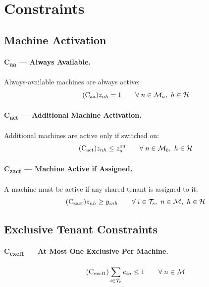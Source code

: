 \documentclass[11pt,a4paper]{article}
\newcommand{\Te}{\mathcal{T}_e}
\newcommand{\Ts}{\mathcal{T}_s}
\newcommand{\M}{\mathcal{M}}
\newcommand{\Ma}{\mathcal{M}_a}
\newcommand{\Mb}{\mathcal{M}_b}
\newcommand{\PH}{\mathcal{H}}
\begin{document}
\section{Constraints}

\subsection{Machine Activation}

\paragraph{C\textsubscript{aa} --- Always Available.}
Always-available machines are always active:
\begin{equation}\tag{C$_{\mathrm{aa}}$}
  z_{nh} = 1 \qquad \forall\; n \in \Ma,\ h \in \PH
\end{equation}

\paragraph{C\textsubscript{act} --- Additional Machine Activation.}
Additional machines are active only if switched on:
\begin{equation}\tag{C$_{\mathrm{act}}$}
  z_{nh} \leq z^{\mathrm{on}}_n \qquad \forall\; n \in \Mb,\ h \in \PH
\end{equation}

\paragraph{C\textsubscript{zact} --- Machine Active if Assigned.}
A machine must be active if any shared tenant is assigned to it:
\begin{equation}\tag{C$_{\mathrm{zact}}$}
  z_{nh} \geq y_{inh} \qquad \forall\; i \in \Ts,\ n \in \M,\ h \in \PH
\end{equation}

\subsection{Exclusive Tenant Constraints}

\paragraph{C\textsubscript{excl1} --- At Most One Exclusive Per Machine.}
\begin{equation}\tag{C$_{\mathrm{excl1}}$}
  \sum_{i \in \Te} e_{in} \leq 1 \qquad \forall\; n \in \M
\end{equation}
\end{document}
